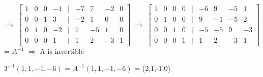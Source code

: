 \begin{tbox}
        $\Rightarrow$
        $\begin{bmatrix}
            1 & 0 & 0 & -1 & | & -7 & 7 & -2 & 0 \\
            0 & 0 & 1 & 3 & | & -2 & 1 & 0 & 0 \\
            0 & 1 & 0 & -2 & | & 7 & -5 & 1 & 0 \\
            0 & 0 & 0 & 1 & | & 1 & 2 & -3 & 1
        \end{bmatrix}$
        $\Rightarrow$
        $\begin{bmatrix}
            1 & 0 & 0 & 0 & | & -6 & 9 & -5 & 1 \\
            0 & 1 & 0 & 0 & | & 9 & -1 & -5 & 2 \\
            0 & 0 & 1 & 0 & | & -5 & -5 & 9 & -3 \\
            0 & 0 & 0 & 1 & | & 1 & 2 & -3 & 1
        \end{bmatrix}$
        \normalsize
        = $A^{-1}$
        $\Rightarrow$ A is invertible

        $T^{-1}(1,1,-1,-6)$
        = $A^{-1}(1,1,-1,-6)$
        = (2,1,-1,0)
    \end{tbox}




